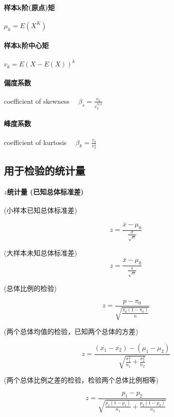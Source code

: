 \documentclass[UTF8,10pt]{book}
\begin{document}
            \paragraph{样本k阶(原点)矩}   $ \mu_k = E(X^K) $

            \paragraph{样本k阶中心矩}  $ v_k = E(X-E(X))^k $

            \paragraph{偏度系数} coefficient of skewness $\quad \beta_s = \frac{v_3}{v_2^{3/2}} $

            \paragraph{峰度系数} coefficient of kurtosis $\quad \beta_k = \frac{v_4}{v_2^2} $

        
        
        \subsection{用于检验的统计量}

            \paragraph{$z$统计量 (已知总体标准差)}

                (小样本已知总体标准差)

                $$z=\frac{\overline{x}-\mu_0}{\frac{\sigma}{\sqrt{n}}}$$

                (大样本未知总体标准差)$$z=\frac{\overline{x}-\mu_0}{\frac{s}{\sqrt{n}}}$$

                (总体比例的检验)

                $$z=\frac{p-\pi_0}{\sqrt{\frac{\pi_0(1-\pi_0)}{n}}}$$
                
                (两个总体均值的检验，已知两个总体的方差)

                $$z=\frac{(\overline{x_1}-\overline{x_2})-(\mu_1-\mu_2)}{\sqrt{\frac{\sigma_1^2}{n_1}+\frac{\sigma_2^2}{n_2}}}$$
                
                (两个总体比例之差的检验，检验两个总体比例相等)

                $$z=\frac{p_1-p_2}{\sqrt{\frac{p_1 (1-p_1)}{n_1}+\frac{p_2 (1-p_2)}{n_2}}}$$
            
\end{document}
